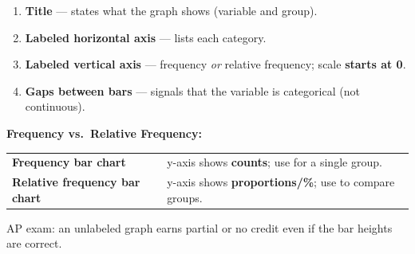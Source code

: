\documentclass[aspectratio=169, 11pt]{beamer}
\begin{document}
{
\begin{frame}[t, plain]
  \vspace{1em}%
  \hspace{0.55cm}%
  \begin{minipage}{0.9\textwidth}
    \small

    \begin{enumerate}
      \setlength{\itemsep}{0.55em}
      \item \textbf{Title} --- states what the graph shows (variable and group).
      \item \textbf{Labeled horizontal axis} --- lists each category.
      \item \textbf{Labeled vertical axis} --- frequency \textit{or} relative
            frequency; scale \textbf{starts at 0}.
      \item \textbf{Gaps between bars} --- signals that the variable is categorical
            (not continuous).
    \end{enumerate}

    \vspace{0.5cm}
    {\color{navy}\bfseries\small Frequency vs.\ Relative Frequency:}\\[6pt]
    \small
    \begin{tabular}{@{} l l @{}}
      \textbf{Frequency bar chart} & y-axis shows \textbf{counts}; use for a single group.\\[4pt]
      \textbf{Relative frequency bar chart} & y-axis shows \textbf{proportions/\%};
        use to compare groups.
    \end{tabular}

    \vspace{0.4cm}
    {\color{slate}\footnotesize
      AP exam: an unlabeled graph earns partial or no credit even if the bar heights are correct.}
  \end{minipage}
\end{frame}
}
\end{document}
